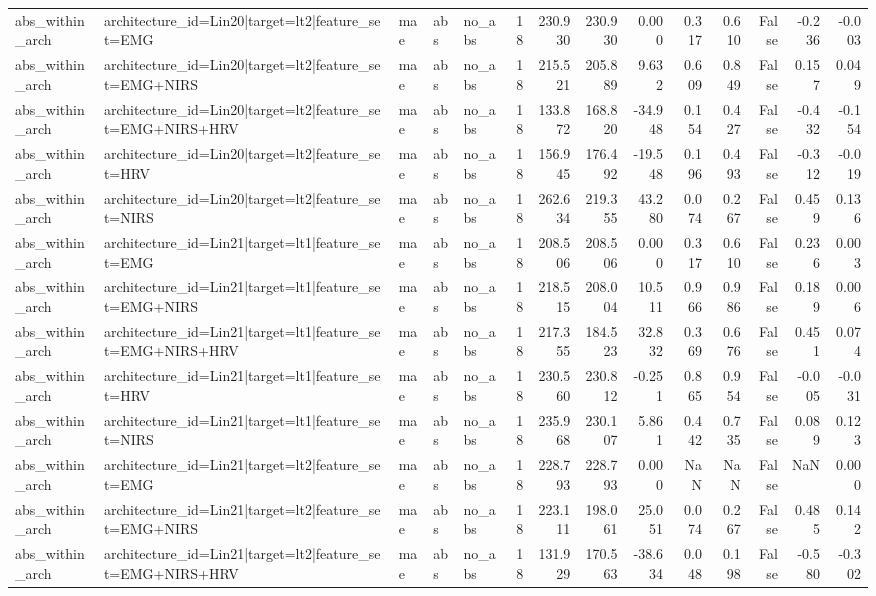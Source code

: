 \begin{table}
\begin{tabular}{lllllrrrrrrrrr}
abs_within_arch & architecture_id=Lin20|target=lt2|feature_set=EMG & mae & abs & no_abs & 18 & 230.930 & 230.930 & 0.000 & 0.317 & 0.610 & False & -0.236 & -0.003 \\
abs_within_arch & architecture_id=Lin20|target=lt2|feature_set=EMG+NIRS & mae & abs & no_abs & 18 & 215.521 & 205.889 & 9.632 & 0.609 & 0.849 & False & 0.157 & 0.049 \\
abs_within_arch & architecture_id=Lin20|target=lt2|feature_set=EMG+NIRS+HRV & mae & abs & no_abs & 18 & 133.872 & 168.820 & -34.948 & 0.154 & 0.427 & False & -0.432 & -0.154 \\
abs_within_arch & architecture_id=Lin20|target=lt2|feature_set=HRV & mae & abs & no_abs & 18 & 156.945 & 176.492 & -19.548 & 0.196 & 0.493 & False & -0.312 & -0.019 \\
abs_within_arch & architecture_id=Lin20|target=lt2|feature_set=NIRS & mae & abs & no_abs & 18 & 262.634 & 219.355 & 43.280 & 0.074 & 0.267 & False & 0.459 & 0.136 \\
abs_within_arch & architecture_id=Lin21|target=lt1|feature_set=EMG & mae & abs & no_abs & 18 & 208.506 & 208.506 & 0.000 & 0.317 & 0.610 & False & 0.236 & 0.003 \\
abs_within_arch & architecture_id=Lin21|target=lt1|feature_set=EMG+NIRS & mae & abs & no_abs & 18 & 218.515 & 208.004 & 10.511 & 0.966 & 0.986 & False & 0.189 & 0.006 \\
abs_within_arch & architecture_id=Lin21|target=lt1|feature_set=EMG+NIRS+HRV & mae & abs & no_abs & 18 & 217.355 & 184.523 & 32.832 & 0.369 & 0.676 & False & 0.451 & 0.074 \\
abs_within_arch & architecture_id=Lin21|target=lt1|feature_set=HRV & mae & abs & no_abs & 18 & 230.560 & 230.812 & -0.251 & 0.865 & 0.954 & False & -0.005 & -0.031 \\
abs_within_arch & architecture_id=Lin21|target=lt1|feature_set=NIRS & mae & abs & no_abs & 18 & 235.968 & 230.107 & 5.861 & 0.442 & 0.735 & False & 0.089 & 0.123 \\
abs_within_arch & architecture_id=Lin21|target=lt2|feature_set=EMG & mae & abs & no_abs & 18 & 228.793 & 228.793 & 0.000 & NaN & NaN & False & NaN & 0.000 \\
abs_within_arch & architecture_id=Lin21|target=lt2|feature_set=EMG+NIRS & mae & abs & no_abs & 18 & 223.111 & 198.061 & 25.051 & 0.074 & 0.267 & False & 0.485 & 0.142 \\
abs_within_arch & architecture_id=Lin21|target=lt2|feature_set=EMG+NIRS+HRV & mae & abs & no_abs & 18 & 131.929 & 170.563 & -38.634 & 0.048 & 0.198 & False & -0.580 & -0.302 \\

\end{tabular}
\end{table}
